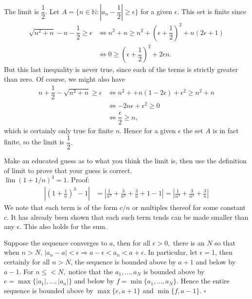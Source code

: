 \documentclass[12pt]{book}
\newenvironment{exercise}[2][Exercise]{\begin{trivlist}
\item[\hskip \labelsep {\bfseries #1}\hskip \labelsep {\bfseries #2.}]}{\end{trivlist}}
\begin{document}
\begin{exercise}{1.4.6}
\begin{exercise}{2.2.5}
The limit is $\dfrac{1}{2}$. Let $A = \{ n \in \mathbb{N} : |a_n - \dfrac{1}{2}| \geq \epsilon\}$ for a given $\epsilon.$ This set is finite since \begin{align*}
\sqrt{n^2 + n} - n - \dfrac{1}{2} \geq \epsilon & \Leftrightarrow n^2 + n \geq n^2 + \left(\epsilon + \dfrac{1}{2}\right)^2 + n(2\epsilon + 1) \\
& \Leftrightarrow 0 \geq \left( \epsilon + \dfrac{1}{2} \right)^2 + 2 \epsilon n. \end{align*}
But this last inequality is never true, since each of the terms is strictly greater than zero. Of course, we might also have 
\begin{align*}
n+\dfrac{1}{2} - \sqrt{n^2 + n} \geq \epsilon & \Leftrightarrow n^2 + +n(1-2\epsilon) + \epsilon^2 \geq n^2 + n \\
& \Leftrightarrow -2n\epsilon + \epsilon^2 \geq 0 \\
& \Leftrightarrow \dfrac{\epsilon}{2} \geq n,
\end{align*}
which is certainly only true for finite $n$. Hence for a given $\epsilon$ the set $A$ is in fact finite, so the limit is $\dfrac{1}{2}.$ 
\end{exercise}


\begin{exercise}{2.2.6}
Make an educated guess as to what you think the limit is, then use the definition of limit to prove that your guess is correct.\\

$\lim (1 + 1/n)^3 = 1$. Proof:
	\begin{align*}
		| (1+ \frac{1}{n})^3 -1 | &= | \frac{1}{n^3} + \frac{3}{n^2}+ \frac{3}{n} + 1 - 1| = | \frac{1}{n^3} + \frac{3}{n^2}+ \frac{3}{n} |	
		\end{align*}
We note that each term is of the form $c/n$ or multiples thereof for some constant $c$. It has already been shown that each such term tends can be made smaller than any $\epsilon$. This also holds for the sum.
\end{exercise}

\begin{exercise}{2.2.7}
Suppose the sequence converges to $a$, then for all $\epsilon > 0,$ there is an $N$ so that when $n > N$, $|a_n - a| < \epsilon \Rightarrow a- \epsilon < a_n < a+\epsilon.$ In particular, let $\epsilon = 1$, then certainly for all $n > N$, the sequence is bounded above by $a+1$ and below by $a-1$. For $n \leq < N,$ notice that the $a_1, ..., a_N$ is bounded above by $e = \max \{|a_1|, ..., |a_n|\}$ and below by $f = \min \{a_1, ..., a_N\}.$ Hence the entire sequence is bounded above by $\max \{e, a+1\}$ and $\min \{f, a-1\}.$ $\square$
\end{exercise}



\end{exercise}
\end{document}
